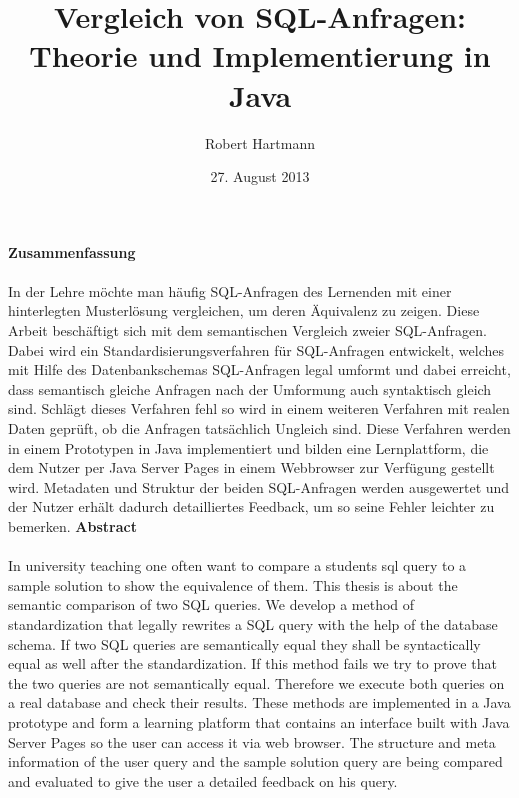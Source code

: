 \documentclass[12pt]{scrreprt}
\author{Robert Hartmann}
\title{Vergleich von SQL-Anfragen: Theorie und Implementierung in Java}
\date{27. August 2013}
\theoremstyle{remark}
\begin{document}

%



\onehalfspacing
\vspace*{10mm}
{\huge \textbf{Zusammenfassung}}\\\\
In der Lehre möchte man häufig SQL-Anfragen des Lernenden mit einer hinterlegten Musterlösung vergleichen, um deren Äquivalenz zu zeigen. Diese Arbeit beschäftigt sich mit dem semantischen Vergleich zweier SQL-Anfragen. Dabei wird ein Standardisierungsverfahren für SQL-Anfragen entwickelt, welches mit Hilfe des Datenbankschemas SQL-Anfragen legal umformt und dabei erreicht, dass semantisch gleiche Anfragen nach der Umformung auch syntaktisch gleich sind. Schlägt dieses Verfahren fehl so wird in einem weiteren Verfahren mit realen Daten geprüft, ob die Anfragen tatsächlich Ungleich sind. Diese Verfahren werden in einem Prototypen in Java implementiert und bilden eine Lernplattform, die dem Nutzer per Java Server Pages in einem Webbrowser zur Verfügung gestellt wird. Metadaten und Struktur der beiden SQL-Anfragen werden ausgewertet und der Nutzer erhält dadurch detailliertes Feedback, um so seine Fehler leichter zu bemerken.\newline\newline\newline\newline\newline
{\huge \textbf{Abstract}}\\\\
In university teaching one often want to compare a students sql query to a sample solution to show the equivalence of them. This thesis is about the semantic comparison of two SQL queries. We develop a method of standardization that legally rewrites a SQL query with the help of the database schema. If two SQL queries are semantically equal they shall be syntactically equal as well after the standardization. If this method fails we try to prove that the two queries are not semantically equal. Therefore we execute both queries on a real database and check their results. These methods are implemented in a Java prototype and form a learning platform that contains an interface built with Java Server Pages so the user can access it via web browser. The structure and meta information of the user query and the sample solution query are being compared and evaluated to give the user a detailed feedback on his query.

\pagestyle{plain}
\end{document}
